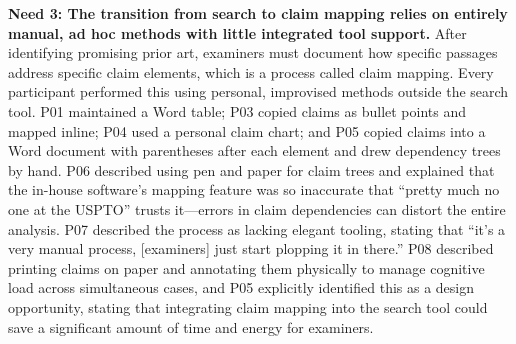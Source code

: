 \documentclass[sigconf]{acmart}
\begin{document}
\smallskip\noindent\textbf{Need 3: The transition from search to claim mapping relies on entirely manual, ad hoc methods with little integrated tool support.}
After identifying promising prior art, examiners must document how specific passages address specific claim elements, which is a process called claim mapping. Every participant performed this using personal, improvised methods outside the search tool. P01 maintained a Word table; P03 copied claims as bullet points and mapped inline; P04 used a personal claim chart; and P05 copied claims into a Word document with parentheses after each element and drew dependency trees by hand. P06 described using pen and paper for claim trees and explained that the in-house software's mapping feature was so inaccurate that ``pretty much no one at the USPTO'' trusts it---errors in claim dependencies can distort the entire analysis. P07 described the process as lacking elegant tooling, stating that ``it's a very manual process, [examiners] just start plopping it in there.'' P08 described printing claims on paper and annotating them physically to manage cognitive load across simultaneous cases, and P05 explicitly identified this as a design opportunity, stating that integrating claim mapping into the search tool could save a significant amount of time and energy for examiners.
\end{document}
